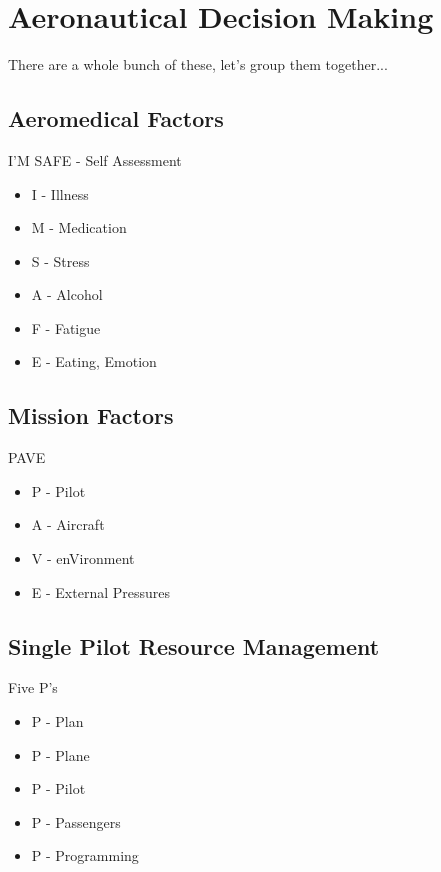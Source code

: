 \section{Aeronautical Decision Making}

There are a whole bunch of these, let's group them together...

\subsection{Aeromedical Factors}

I'M SAFE - Self Assessment

\begin{itemize}
    \item I - Illness
    \item M - Medication
    \item S - Stress
    \item A - Alcohol
    \item F - Fatigue
    \item E - Eating, Emotion
\end{itemize}

\subsection{Mission Factors}

PAVE

\begin{itemize}
    \item P - Pilot
    \item A - Aircraft
    \item V - enVironment
    \item E - External Pressures
\end{itemize}

\subsection{Single Pilot Resource Management}

Five P's

\begin{itemize}
    \item P - Plan
    \item P - Plane
    \item P - Pilot
    \item P - Passengers
    \item P - Programming
\end{itemize}

